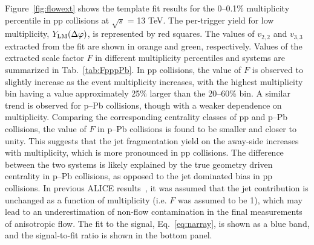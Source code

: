 Figure~\ref{fig:flowext} shows the template fit results for the 0--0.1\% multiplicity percentile in pp collisions at $\sqrt{s}$ = 13 TeV. The per-trigger yield for low multiplicity, $Y_{\rm{LM}}(\Delta\varphi)$, is represented by red squares. The values of $v_{2,2}$ and $v_{3,3}$ extracted from the fit are shown in orange and green, respectively. Values of the extracted scale factor $F$ in different multiplicity percentiles and systems are summarized in Tab.~\ref{tab:FpppPb}. In pp collisions, the value of $F$ is observed to slightly increase as the event multiplicity increases, with the highest multiplicity bin having a value approximately 25\% larger than the 20--60\% bin. A similar trend is observed for p--Pb collisions, though with a weaker dependence on multiplicity. Comparing the corresponding centrality classes of pp and p--Pb collisions, the value of $F$ in p--Pb collisions is found to be smaller and closer to unity.
This suggests that the jet fragmentation yield on the away-side increases with multiplicity, which is more pronounced in pp collisions. The difference between the two systems is likely explained by the true geometry driven centrality in p--Pb collisions, as opposed to the jet dominated bias in pp collisions.
 In previous ALICE results~\cite{ALICE:2012eyl,ALICE:2013snk}, it was assumed that the jet contribution is unchanged as a function of multiplicity (i.e. $F$ was assumed to be 1), which may lead to an underestimation of non-flow contamination in the final measurements of anisotropic flow. 
 The fit to the signal, Eq.~\ref{eq:narray}, is shown as a blue band, and the signal-to-fit ratio is shown in the bottom panel. 
\begin{table}[h!]
\caption{The scale factor $F$ for various multiplicity percentiles in pp (top) and p--Pb (bottom) collisions.}
\centering
{}
\label{tab:FpppPb}
\end{table}

